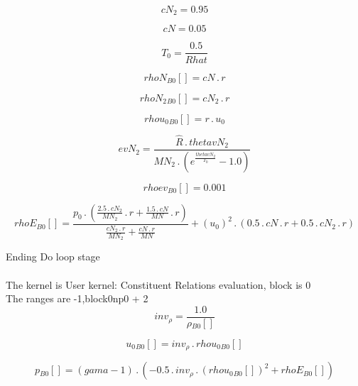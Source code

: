 \documentclass{article}
\begin{document}
\begin{dmath}cN_{2} = 0.95\end{dmath}

\begin{dmath}cN = 0.05\end{dmath}

\begin{dmath}T_{0} = \frac{0.5}{Rhat}\end{dmath}

\begin{dmath}{rhoN{_{B0}}}[{}] = cN \,.\, r\end{dmath}

\begin{dmath}{rhoN_{2}{_{B0}}}[{}] = cN_{2} \,.\, r\end{dmath}

\begin{dmath}{rhou_{0}{_{B0}}}[{}] = r \,.\, u_{0}\end{dmath}

\begin{dmath}evN_{2} = \frac{\hat{R} \,.\, thetavN_{2}}{MN_{2} \,.\, \left(e^{\frac{thetavN_{2}}{T_{0}}} - 1.0\right)}\end{dmath}

\begin{dmath}{rhoev{_{B0}}}[{}] = 0.001\end{dmath}

\begin{dmath}{rhoE{_{B0}}}[{}] = \frac{p_{0} \,.\, \left(\frac{2.5 \,.\, cN_{2}}{MN_{2}} \,.\, r + \frac{1.5 \,.\, cN}{MN} \,.\, r\right)}{\frac{cN_{2} \,.\, r}{MN_{2}} + \frac{cN \,.\, r}{MN}} + \left(u_{0} \right)^{2} \,.\, \left(0.5 \,.\, cN \,.\, 
r + 0.5 \,.\, cN_{2} \,.\, r\right)\end{dmath}

\noindent Ending Do loop stage\\
\\\noindent The kernel is User kernel: Constituent Relations evaluation, block is 0\\\noindent The ranges are -1,block0np0 + 2\\\begin{dmath}inv_{\rho} = \frac{1.0}{{\rho{_{B0}}}[{}]}\end{dmath}

\begin{dmath}{u_{0}{_{B0}}}[{}] = inv_{\rho} \,.\, {rhou_{0}{_{B0}}}[{}]\end{dmath}

\begin{dmath}{p{_{B0}}}[{}] = \left(gama - 1\right) \,.\, \left(- 0.5 \,.\, inv_{\rho} \,.\, \left({rhou_{0}{_{B0}}}[{}] \right)^{2} + {rhoE{_{B0}}}[{}]\right)\end{dmath}
\end{document}

